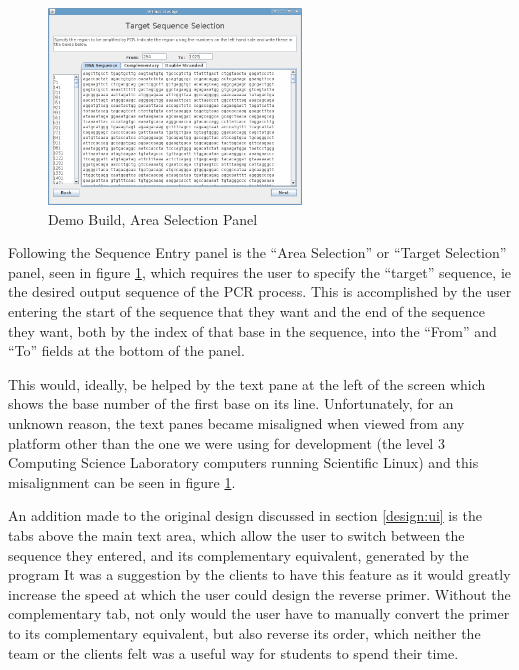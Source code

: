 \begin{figure}[h]
  \begin{center}
    \includegraphics[width=0.6\textwidth]{./images/demoBuild/areaSelection.png}
    \caption{
      \label{fig:demoBuild:areaSelection}
      Demo Build, Area Selection Panel
    }
  \end{center}
\end{figure}

Following the Sequence Entry panel is the ``Area Selection'' or
``Target Selection'' panel, seen in figure
\ref{fig:demoBuild:areaSelection}, which requires the user to specify
the ``target'' sequence, ie the desired output sequence of the PCR
process.
This is accomplished by the user entering the start of the sequence
that they want and the end of the sequence they want, both by the
index of that base in the sequence, into the ``From'' and ``To''
fields at the bottom of the panel.

This would, ideally, be helped by the text pane at the left of the
screen which shows the base number of the first base on its line.
Unfortunately, for an unknown reason, the text panes became misaligned
when viewed from any platform other than the one we were using for
development (the level 3 Computing Science Laboratory computers
running Scientific Linux) and this misalignment can be seen in figure
\ref{fig:demoBuild:areaSelection}.

An addition made to the original design discussed in section
\ref{design:ui} is the tabs above the main text area, which allow the
user to switch between the sequence they entered, and its
complementary equivalent, generated by the program
It was a suggestion by the clients to have this feature as it would
greatly increase the speed at which the user could design the reverse
primer.
Without the complementary tab, not only would the user have to
manually convert the primer to its complementary equivalent, but also
reverse its order, which neither the team or the clients felt was a
useful way for students to spend their time. 

